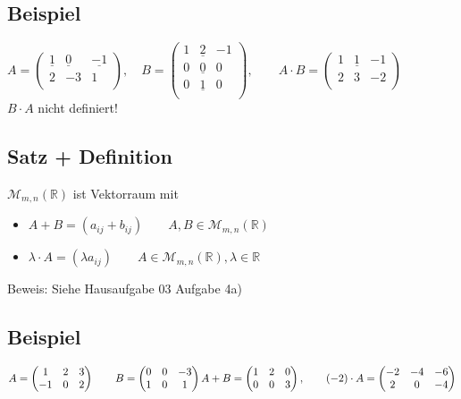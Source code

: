 \documentclass[12pt,titlepage, pdf]{article}
\newcommand{\R}{\mathds{R}}
\newcommand{\uline}[1]{\underline{#1}}
\renewcommand{\>}{\rightarrow}
\renewcommand{\*}{\cdot}
\begin{document}
	\subsection{Beispiel}
	$A = \begin{pmatrix}
	\uline{1} &\uline{0} & \uline{-1}\\
	2 & -3 & 1\\
	\end{pmatrix},\quad B = \begin{pmatrix}
	1 & \uline{2} & -1 \\
	0 & \uline{0} & 0\\
	0 & \uline{1} & 0 \\
	\end{pmatrix}, \qquad
	A \cdot B = \begin{pmatrix}
	1 & \uline{1} & -1 \\
	2 & 3 & -2 \\
	\end{pmatrix}$\\
	$B\cdot A$ nicht definiert!
	\subsection{Satz + Definition}
	$\mathcal{M}_{m,n}(\R)$ ist Vektorraum mit 
	\begin{itemize}
		\item $A + B = (a_{ij} + b_{ij}) \qquad A,B \in \mathcal{M}_{m,n}(\R)$
		\item $\lambda \cdot A = (\lambda a_{ij})\qquad A \in \mathcal{M}_{m,n}(\R), \lambda \in \R$
	\end{itemize}
	Beweis: Siehe Hausaufgabe 03 Aufgabe 4a)
	\subsection{Beispiel}
	$A = \begin{pmatrix}
	1 & 2 & 3 \\
	-1 & 0 & 2 \\
	\end{pmatrix}\qquad B = \begin{pmatrix}
	0& 0& -3 \\
	1&0&1 \\
	\end{pmatrix} \\
	A + B = \begin{pmatrix}
	1 & 2 & 0 \\
	0 & 0 & 3 \\
	\end{pmatrix}, \qquad (-2) \cdot A = \begin{pmatrix}
	-2 & -4 & -6 \\
	2 & 0 & -4 \\
	\end{pmatrix}$
\end{document}
